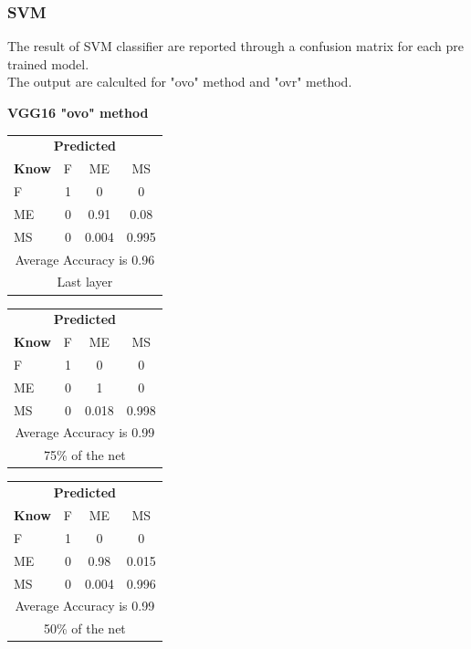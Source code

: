 \documentclass[12pt]{article} %
\begin{document}
\subsubsection {SVM}
The result of SVM classifier are reported through a confusion matrix for each pre trained model.\\
The output are calculted for "ovo" method and "ovr" method.\\
\begin{center}
\textbf{ VGG16  "ovo" method}
\end{center}
\begin{minipage}{0.5\textwidth}
\begin{center}
\begin{tabular}{l|c|c|c|}
 \multicolumn{4}{c}{ \textbf{ Predicted}}\\
 \textbf{Know}&F&ME&MS\\ \hline\hline
F   &1&0&0\\
ME &0&0.91&0.08\\
MS &0&0.004&0.995\\
\multicolumn{4}{c}{Average Accuracy is 0.96}\\
\multicolumn{4}{c}{Last layer}\\
\end{tabular}
\end{center}
\end{minipage}
\begin{minipage}{0.5\textwidth}
\begin{center}
\begin{tabular}{l|c|c|c|}
 \multicolumn{4}{c}{ \textbf{ Predicted}}\\
 \textbf{Know}&F&ME&MS\\ \hline\hline
F   &1&0&0\\
ME &0&1&0\\
MS &0&0.018&0.998\\
\multicolumn{4}{c}{Average Accuracy is 0.99}\\
\multicolumn{4}{c}{75\%  of the net}\\
\end{tabular}
\end{center}
\end{minipage}
\begin{minipage}{0.5\textwidth}
\begin{center}
\begin{tabular}{l|c|c|c|}
 \multicolumn{4}{c}{ \textbf{ Predicted}}\\
 \textbf{Know}&F&ME&MS\\ \hline\hline
F   &1&0&0\\
ME &0&0.98&0.015\\
MS &0&0.004&0.996\\
\multicolumn{4}{c}{Average Accuracy is 0.99}\\
\multicolumn{4}{c}{50\%  of the net}\\
\end{tabular}
\end{center}
\end{minipage}
\end{document}
